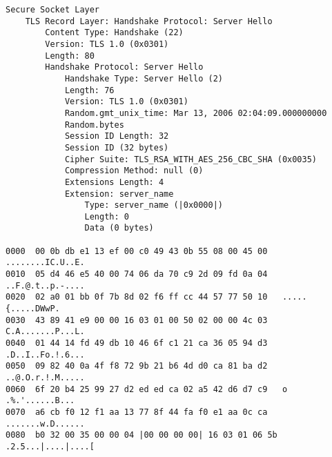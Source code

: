 \begin{lstlisting}[caption=Resposta ao \emph{request} do Opera 9 -- Decodificação da mensagem \tlsHsSh]
Secure Socket Layer
    TLS Record Layer: Handshake Protocol: Server Hello
        Content Type: Handshake (22)
        Version: TLS 1.0 (0x0301)
        Length: 80
        Handshake Protocol: Server Hello
            Handshake Type: Server Hello (2)
            Length: 76
            Version: TLS 1.0 (0x0301)
            Random.gmt_unix_time: Mar 13, 2006 02:04:09.000000000
            Random.bytes
            Session ID Length: 32
            Session ID (32 bytes)
            Cipher Suite: TLS_RSA_WITH_AES_256_CBC_SHA (0x0035)
            Compression Method: null (0)
            Extensions Length: 4
            Extension: server_name
                Type: server_name (|0x0000|)
                Length: 0
                Data (0 bytes)

0000  00 0b db e1 13 ef 00 c0 49 43 0b 55 08 00 45 00   ........IC.U..E.
0010  05 d4 46 e5 40 00 74 06 da 70 c9 2d 09 fd 0a 04   ..F.@.t..p.-....
0020  02 a0 01 bb 0f 7b 8d 02 f6 ff cc 44 57 77 50 10   .....{.....DWwP.
0030  43 89 41 e9 00 00 16 03 01 00 50 02 00 00 4c 03   C.A.......P...L.
0040  01 44 14 fd 49 db 10 46 6f c1 21 ca 36 05 94 d3   .D..I..Fo.!.6...
0050  09 82 40 0a 4f f8 72 9b 21 b6 4d d0 ca 81 ba d2   ..@.O.r.!.M.....
0060  6f 20 b4 25 99 27 d2 ed ed ca 02 a5 42 d6 d7 c9   o .%.'......B...
0070  a6 cb f0 12 f1 aa 13 77 8f 44 fa f0 e1 aa 0c ca   .......w.D......
0080  b0 32 00 35 00 00 04 |00 00 00 00| 16 03 01 06 5b   .2.5...|....|....[
\end{lstlisting}
